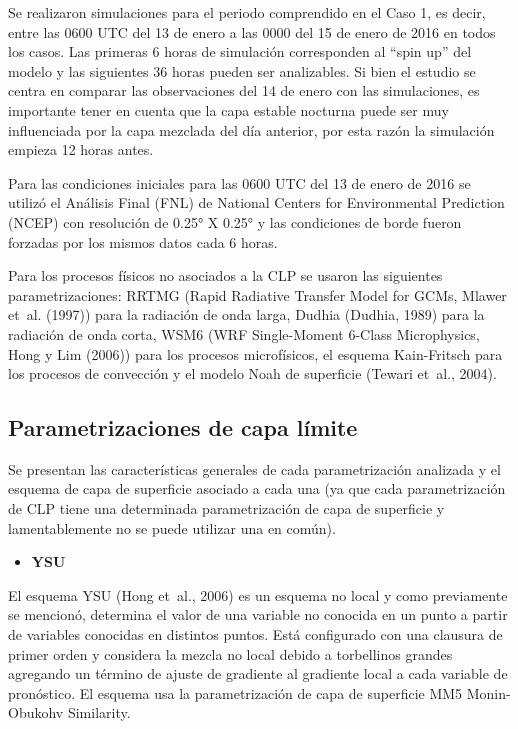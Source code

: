 \documentclass[12pt,spanish,oneside]{book}
\providecommand{\tightlist}{%
  \setlength{\itemsep}{0pt}\setlength{\parskip}{0pt}}
\begin{document}
Se realizaron simulaciones para el periodo comprendido en el Caso 1, es
decir, entre las 0600 UTC del 13 de enero a las 0000 del 15 de enero de
2016 en todos los casos. Las primeras 6 horas de simulación corresponden
al ``spin up'' del modelo y las siguientes 36 horas pueden ser
analizables. Si bien el estudio se centra en comparar las observaciones
del 14 de enero con las simulaciones, es importante tener en cuenta que
la capa estable nocturna puede ser muy influenciada por la capa mezclada
del día anterior, por esta razón la simulación empieza 12 horas antes.

Para las condiciones iniciales para las 0600 UTC del 13 de enero de 2016
se utilizó el Análisis Final (FNL) de National Centers for Environmental
Prediction (NCEP) con resolución de 0.25° X 0.25° y las condiciones de
borde fueron forzadas por los mismos datos cada 6 horas.

Para los procesos físicos no asociados a la CLP se usaron las siguientes
parametrizaciones: RRTMG (Rapid Radiative Transfer Model for GCMs,
Mlawer et~al. (1997)) para la radiación de onda larga, Dudhia (Dudhia,
1989) para la radiación de onda corta, WSM6 (WRF Single-Moment 6-Class
Microphysics, Hong y Lim (2006)) para los procesos microfísicos, el
esquema Kain-Fritsch para los procesos de convección y el modelo Noah de
superficie (Tewari et~al., 2004).

\subsection{Parametrizaciones de capa
límite}\label{parametrizaciones-de-capa-limite}

Se presentan las características generales de cada parametrización
analizada y el esquema de capa de superficie asociado a cada una (ya que
cada parametrización de CLP tiene una determinada parametrización de
capa de superficie y lamentablemente no se puede utilizar una en común).

\begin{itemize}
\tightlist
\item
  \textbf{YSU}
\end{itemize}

El esquema YSU (Hong et~al., 2006) es un esquema no local y como
previamente se mencionó, determina el valor de una variable no conocida
en un punto a partir de variables conocidas en distintos puntos. Está
configurado con una clausura de primer orden y considera la mezcla no
local debido a torbellinos grandes agregando un término de ajuste de
gradiente al gradiente local a cada variable de pronóstico. El esquema
usa la parametrización de capa de superficie MM5 Monin-Obukohv
Similarity.
\end{document}
